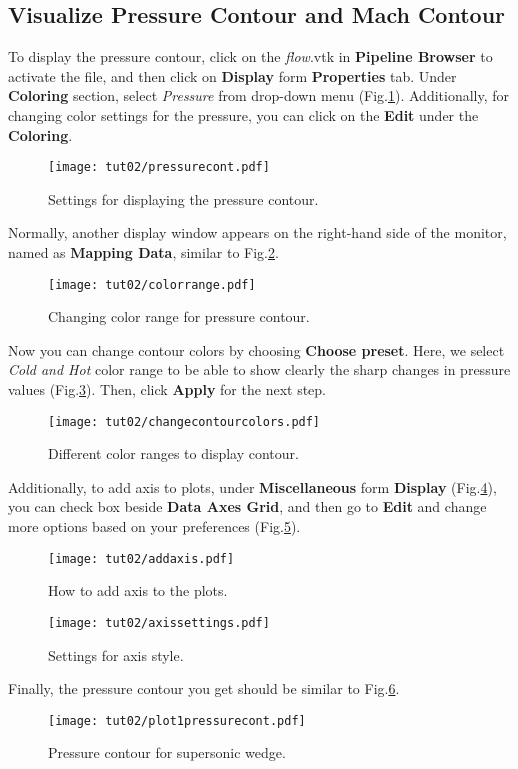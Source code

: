 \subsection{Visualize Pressure Contour and Mach Contour}
To display the pressure contour, click on the \textit{flow}.vtk in \textbf{Pipeline Browser} to activate the file, and then click on \textbf{Display} form \textbf{Properties} tab. Under \textbf{Coloring} section, select \textit{Pressure} from drop-down menu (Fig.\ref{fig:pressure contours setting}). Additionally, for changing color settings for the pressure, you can click on the \textbf{Edit} under the \textbf{Coloring}.
\begin{figure}[htbp]
    \centering
    \texttt{[image: tut02/pressurecont.pdf]}
    \caption{Settings for displaying the pressure contour.}
    \label{fig:pressure contours setting}
\end{figure}
Normally, another display window appears on the right-hand side of the monitor, named as \textbf{Mapping Data}, similar to Fig.\ref{fig:color_range}.
\begin{figure}[htbp]
    \centering
    \texttt{[image: tut02/colorrange.pdf]}
    \caption{Changing color range for pressure contour.}
    \label{fig:color_range}
\end{figure}
Now you can change contour colors by choosing \textbf{Choose preset}. Here, we select \textit{Cold and Hot} color range to be able to show clearly the sharp changes in pressure values (Fig.\ref{fig:color_range_item}). Then, click \textbf{Apply} for the next step.
\begin{figure}[htbp]
    \centering
    \texttt{[image: tut02/changecontourcolors.pdf]}
    \caption{Different color ranges to display contour.}
    \label{fig:color_range_item}
\end{figure}
Additionally, to add axis to plots, under \textbf{Miscellaneous} form \textbf{Display} (Fig.\ref{fig:add axis}), you can check box beside \textbf{Data Axes Grid}, and then go to \textbf{Edit} and change more options based on your preferences (Fig.\ref{fig:axis setting}).
\begin{figure}[htbp]
    \centering
    \texttt{[image: tut02/addaxis.pdf]}
    \caption{How to add axis to the plots.}
    \label{fig:add axis}
\end{figure}
\begin{figure}[htbp]
    \centering
    \texttt{[image: tut02/axissettings.pdf]}
    \caption{Settings for axis style.}
    \label{fig:axis setting}
\end{figure}
Finally, the pressure contour you get should be similar to Fig.\ref{fig:plot pressure cont1}.
\begin{figure}[htbp]
    \centering
    \texttt{[image: tut02/plot1pressurecont.pdf]}
    \caption{Pressure contour for supersonic wedge.}
    \label{fig:plot pressure cont1}
\end{figure}

